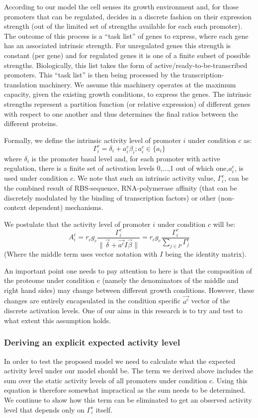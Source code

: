 \documentclass{report}
\providecommand{\norm}[1]{\lVert#1\rVert}
\begin{document}
According to our model the cell senses its growth environment and, for those promoters that can be regulated, decides in a discrete fashion on their expression strength (out of the limited set of strengths available for each such promoter).
The outcome of this process is a “task list” of genes to express, where each gene has an associated intrinsic strength.
For unregulated genes this strength is constant (per gene) and for regulated genes it is one of a finite subset of possible strengths.
Biologically, this list takes the form of active/ready-to-be-transcribed promoters.
This “task list” is then being processed by the transcription-translation machinery.
We assume this machinery operates at the maximum capacity, given the existing growth conditions, to express the genes.
The intrinsic strengths represent a partition function (or relative expression) of different genes with respect to one another and thus determines the final ratios between the different proteins.

Formally, we define the intrinsic activity level of promoter $i$ under condition $c$ as:
\[\Gamma^c_i=\delta_i+a^c_i\beta_i ; a^c_i\in \{a_i\}\]
where $\delta_i$ is the promoter basal level and, for each promoter with active regulation, there is a finite set of activation levels {0,...,1} out of which one,$a^c_i$, is used under condition $c$.
We note that such an intrinsic activity value, $\Gamma^c_i$, can be the combined result of RBS-sequence, RNA-polymerase affinity (that can be discretely modulated by the binding of transcription factors) or other (non-context dependent) mechanisms.

We postulate that the activity level of promoter $i$ under condition $c$ will be:
\begin{equation}
\label{cond-act}
A^c_i=r_cg_c\frac{\Gamma^c_i}{\norm{\vec{\delta}+\vec{a^c}I\vec{\beta}}}=r_cg_c\frac{\Gamma^c_i}{\sum_{j\in P}\Gamma^c_j}
\end{equation}
(Where the middle term uses vector notation with $I$ being the identity matrix).

An important point one needs to pay attention to here is that the composition of the proteome under condition c (namely the denominators of the middle and right hand sides) may change between different growth conditions.
However, these changes are entirely encapsulated in the condition specific $\vec{a^c}$ vector of the discrete activation levels.
One of our aims in this research is to try and test to what extent this assumption holds.
\subsubsection{Deriving an explicit expected activity level}
In order to test the proposed model we need to calculate what the expected activity level under our model should be.
The term we derived above includes the sum over the static activity levels of all promoters under condition c.
Using this equation is therefore somewhat impractical as the sum needs to be determined.
We continue to show how this term can be eliminated to get an observed activity level that depends only on $\Gamma^c_i$ itself.
\end{document}
